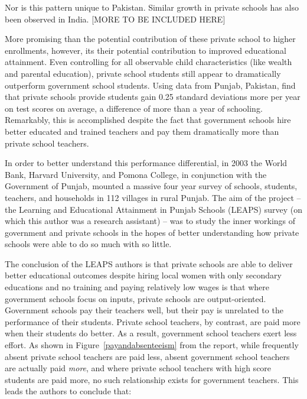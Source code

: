\documentclass[12pt]{article}
\begin{document}
Nor is this pattern unique to Pakistan. Similar growth in private schools has also been observed in India. [MORE TO BE INCLUDED HERE]

More promising than the potential contribution of these private school to higher enrollments, however, its their potential contribution to improved educational attainment. Even controlling for all observable child characteristics (like wealth and parental education), private school students still appear to dramatically outperform government school students. Using data from Punjab, Pakistan, \cite{Andrabi:2011hl} find that private schools provide students gain 0.25 standard deviations more per year on test scores on average, a difference of more than a year of schooling. Remarkably, this is accomplished despite the fact that government schools hire better educated and trained teachers and pay them dramatically more than private school teachers. 

In order to better understand this performance differential, in 2003 the World Bank, Harvard University, and Pomona College, in conjunction with the Government of Punjab, mounted a massive four year survey of schools, students, teachers, and households in 112 villages in rural Punjab. The aim of the project -- the Learning and Educational Attainment in Punjab Schools (LEAPS) survey (on which this author was a research assistant) -- was to study the inner workings of government and private schools in the hopes of better understanding how private schools were able to do so much with so little. 

The conclusion of the LEAPS authors is that private schools are able to deliver better educational outcomes despite hiring local women with only secondary educations and no training and paying relatively low wages is that where government schools focus on inputs, private schools are output-oriented. Government schools pay their teachers well, but their pay is unrelated to the performance of their students. Private school teachers, by contrast, are paid more when their students do better. As a result, government school teachers exert less effort. As shown in Figure~\ref{payandabsenteeism} from the report, while frequently absent private school teachers are paid less, absent government school teachers are actually paid \emph{more}, and where private school teachers with high score students are paid more, no such relationship exists for government teachers. This leads the authors to conclude that:
\end{document}
